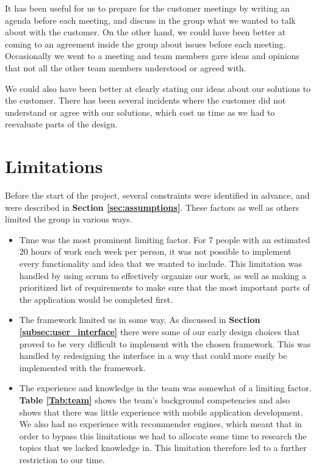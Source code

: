 It has been useful for us to prepare for the customer meetings by writing an agenda before each meeting, and discuss in the group what we wanted to talk about with the customer. On the other hand, we could have been better at coming to an agreement inside the group about issues before each meeting. Occasionally we went to a meeting and team members gave ideas and opinions that not all the other team members understood or agreed with.\newline

We could also have been better at clearly stating our ideas about our solutions to the customer.  There has been several incidents where the customer did not understand or agree with our solutions, which cost us time as we had to reevaluate parts of the design.

\section{Limitations}

Before the start of the project, several constraints were identified in advance, and were described in \textbf{Section \ref{sec:assumptions}}. These factors as well as others limited the group in various ways.

\begin{itemize}
\item Time was the most prominent limiting factor. For 7 people with an estimated 20 hours of work each week per person, it was not possible to implement every functionality and idea that we wanted to include. This limitation was handled by using scrum to effectively organize our work, as well as making a prioritized list of requirements to make sure that the most important parts of the application would be completed first.

\item The framework limited us in some way. As discussed in \textbf{Section \ref{subsec:user_interface}} there were some of our early design choices that proved to be very difficult to implement with the chosen framework. This was handled by redesigning the interface in a way that could more easily be implemented with the framework. 

\item The experience and knowledge in the team was somewhat of a limiting factor. \textbf{Table \ref{Tab:team}} shows the team's background competencies and also shows that there was little experience with mobile application development. We also had no experience with recommender engines, which meant that in order to bypass this limitations we had to allocate some time to research the topics that we lacked knowledge in. This limitation therefore led to a further restriction to our time.

\end{itemize}

